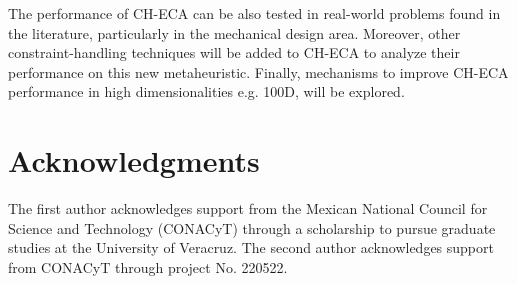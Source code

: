 \documentclass[conference]{IEEEtran}
\begin{document}
The performance of CH-ECA can be also tested in real-world problems found in the 
literature, particularly in the mechanical design area. Moreover, other 
constraint-handling techniques will be added to CH-ECA to analyze their performance 
on this new metaheuristic. Finally, mechanisms to improve CH-ECA performance in high 
dimensionalities e.g. 100D, will be explored.  

\section*{Acknowledgments} %
The first author acknowledges support from the Mexican National Council for Science 
and Technology (CONACyT) through a scholarship to pursue graduate studies at the 
University of Veracruz. The second author acknowledges support from CONACyT through 
project No. 220522. 



\end{document}
